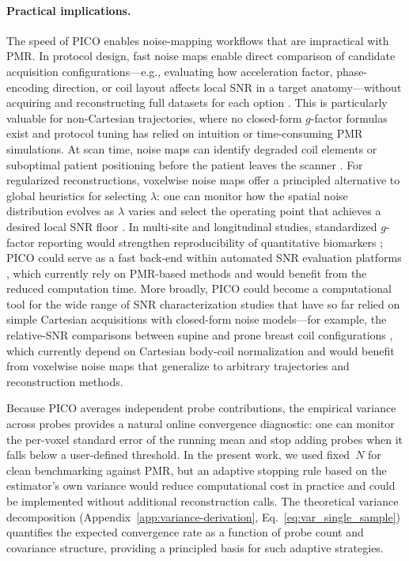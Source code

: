 \documentclass[AMA,STIX2COL,Linenumberson]{MRM}
\begin{document}
\paragraph{Practical implications.}
The speed of PICO enables noise-mapping workflows
that are impractical with PMR. In protocol design, fast noise 
maps enable direct comparison of candidate acquisition 
configurations---e.g., evaluating how acceleration factor, 
phase-encoding direction, or coil layout affects local SNR in 
a target anatomy---without acquiring and reconstructing full 
datasets for each option 
\cite{robson2008snrgfactor,Breuer2009}. This is 
particularly valuable for non-Cartesian trajectories, where 
no closed-form $g$-factor formulas exist and protocol tuning 
has relied on intuition or time-consuming PMR simulations. 
At scan time, noise maps can identify degraded coil elements 
or suboptimal patient positioning before the patient leaves 
the scanner \cite{image_recon_SNR}. For regularized 
reconstructions, voxelwise noise maps offer a principled 
alternative to global heuristics for selecting $\lambda$: 
one can monitor how the spatial noise distribution evolves as 
$\lambda$ varies and select the operating point that achieves 
a desired local SNR floor 
\cite{knoll2017cs_clinical,hanhela2021regparam}. In 
multi-site and longitudinal studies, standardized $g$-factor 
reporting would strengthen reproducibility of quantitative 
biomarkers \cite{boudreau2023ismrm,boscolo2025multisite}; 
PICO could serve as a fast back-end within 
automated SNR evaluation platforms \cite{montin2026mroptimum}, which currently rely on 
PMR-based methods and would benefit from the reduced 
computation time.
More broadly, PICO could become a 
computational tool for the wide range of SNR 
characterization studies that have so far relied on 
simple Cartesian acquisitions with closed-form noise 
models---for example, the relative-SNR comparisons between 
supine and prone breast coil configurations \cite{hess2026breastsnr}, which currently 
depend on Cartesian body-coil normalization and would benefit 
from voxelwise noise maps that generalize to arbitrary 
trajectories and reconstruction methods.


Because PICO averages independent probe contributions, the empirical variance across probes provides a natural online convergence diagnostic: one can monitor the per-voxel standard error of the running mean and stop adding probes when it falls below a user-defined threshold. In the present work, we used fixed~$N$ for clean benchmarking against PMR, but an adaptive stopping rule based on the estimator's own variance would reduce computational cost in practice and could be implemented without additional reconstruction calls. The theoretical variance decomposition (Appendix~\ref{app:variance-derivation}, Eq.~\eqref{eq:var_single_sample}) quantifies the expected convergence rate as a function of probe count and covariance structure, providing a principled basis for such adaptive strategies.
\end{document}
